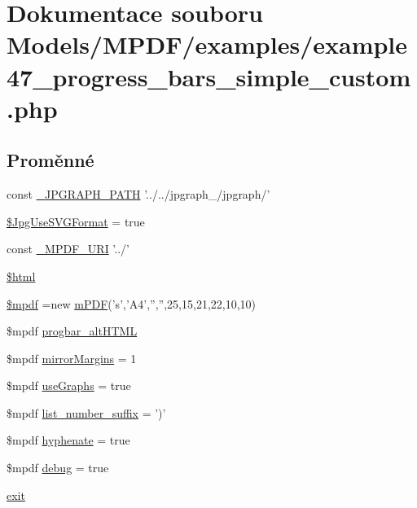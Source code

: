 \hypertarget{example47__progress__bars__simple__custom_8php}{\section{Dokumentace souboru Models/\-M\-P\-D\-F/examples/example47\-\_\-progress\-\_\-bars\-\_\-simple\-\_\-custom.php}
\label{example47__progress__bars__simple__custom_8php}
}
\subsection*{Proměnné}
\begin{DoxyCompactItemize}
\item 
const \hyperlink{example47__progress__bars__simple__custom_8php_aa256b12517ab22b9550c150865a689c4}{\-\_\-\-J\-P\-G\-R\-A\-P\-H\-\_\-\-P\-A\-T\-H} '../../jpgraph\-\_/jpgraph/'
\item 
\hyperlink{example47__progress__bars__simple__custom_8php_a4767d5ef05aa1f95f7a64c0aa8f26ccc}{\$\-Jpg\-Use\-S\-V\-G\-Format} = true
\item 
const \hyperlink{example47__progress__bars__simple__custom_8php_a1ff50e3d84f8270d034f2e9d99c147c0}{\-\_\-\-M\-P\-D\-F\-\_\-\-U\-R\-I} '../'
\item 
\hyperlink{example47__progress__bars__simple__custom_8php_a6f96e7fc92441776c9d1cd3386663b40}{\$html}
\item 
\hyperlink{example47__progress__bars__simple__custom_8php_ad028f81910d6cbab9b184d2214b3a8f8}{\$mpdf} =new \hyperlink{classm_p_d_f}{m\-P\-D\-F}('s','A4','','',25,15,21,22,10,10)
\item 
\$mpdf \hyperlink{example47__progress__bars__simple__custom_8php_a26fa4148e931f73109914c61d46e796a}{progbar\-\_\-alt\-H\-T\-M\-L}
\item 
\$mpdf \hyperlink{example47__progress__bars__simple__custom_8php_a24c284cb7774410f65953584ea1fd9c1}{mirror\-Margins} = 1
\item 
\$mpdf \hyperlink{example47__progress__bars__simple__custom_8php_a789abe3531b709632605a9c52e9ba0d9}{use\-Graphs} = true
\item 
\$mpdf \hyperlink{example47__progress__bars__simple__custom_8php_a0e143fd6cd1ed977446f3abf05380031}{list\-\_\-number\-\_\-suffix} = ')'
\item 
\$mpdf \hyperlink{example47__progress__bars__simple__custom_8php_a988e0360138a1001f27d70c65256d100}{hyphenate} = true
\item 
\$mpdf \hyperlink{example47__progress__bars__simple__custom_8php_a200a436f1833a712239f1ae5bec608db}{debug} = true
\item 
\hyperlink{example47__progress__bars__simple__custom_8php_a6733eb5f605d09eaede9845835d71c4e}{exit}
\end{DoxyCompactItemize}


